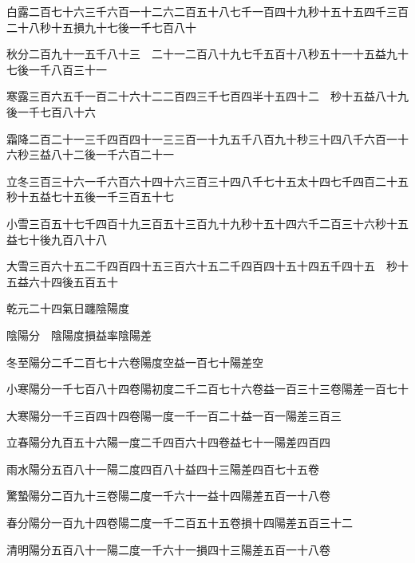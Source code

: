 \begin{pinyinscope}
 白露二百七十六三千六百一十二六二百五十八七千一百四十九秒十五十五四千三百二十八秒十五損九十七後一千七百八十



 秋分二百九十一五千八十三　二十一二百八十九七千五百十八秒五十一十五益九十七後一千八百三十一



 寒露三百六五千一百二十六十二二百四三千七百四半十五四十二　秒十五益八十九後一千七百八十六



 霜降二百二十一三千四百四十一三三百一十九五千八百九十秒三十四八千六百一十六秒三益八十二後一千六百二十一



 立冬三百三十六一千六百六十四十六三百三十四八千七十五太十四七千四百二十五秒十五益七十五後一千三百五十七



 小雪三百五十七千四百十九三百五十三百九十九秒十五十四六千二百三十六秒十五益七十後九百八十八



 大雪三百六十五二千四百四十五三百六十五二千四百四十五十四五千四十五　秒十五益六十四後五百五十



 乾元二十四氣日躔陰陽度



 陰陽分　陰陽度損益率陰陽差



 冬至陽分二千二百七十六卷陽度空益一百七十陽差空



 小寒陽分一千七百八十四卷陽初度二千二百七十六卷益一百三十三卷陽差一百七十



 大寒陽分一千三百四十四卷陽一度一千一百二十益一百一陽差三百三



 立春陽分九百五十六陽一度二千四百六十四卷益七十一陽差四百四



 雨水陽分五百八十一陽二度四百八十益四十三陽差四百七十五卷



 驚蟄陽分二百九十三卷陽二度一千六十一益十四陽差五百一十八卷



 春分陽分一百九十四卷陽二度一千二百五十五卷損十四陽差五百三十二



 清明陽分五百八十一陽二度一千六十一損四十三陽差五百一十八卷




\end{pinyinscope}

